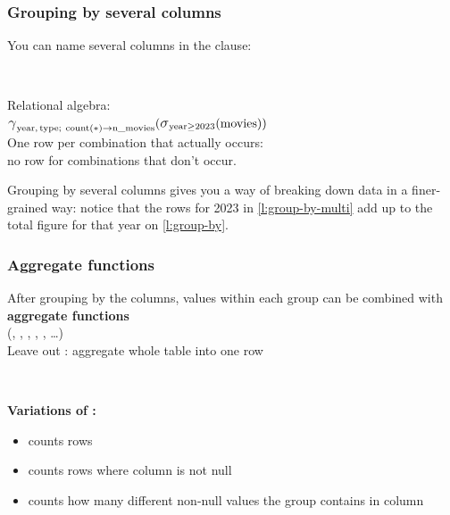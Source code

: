 \begin{frame}
    \label{s:group-by-multi}
    \frametitle{Grouping by several columns}
    You can name several columns in the  clause:
    \inputminted[fontsize=\footnotesize]{sql}{code/sql-group-by2.sql}
    \vspace{0.3em}
    {\footnotesize}\\[0.8em]
    Relational algebra:\\
    \hspace*{1em}$\raop{\gamma}_{\ra{year},\,\ra{type};\ \ra{count}(*) \to \ra{n\_movies}}(\raop{\sigma}_{\ra{year} \ge 2023}(\ra{movies}))$\\[0.8em]
    One row per  combination that actually occurs:\\
    no row for combinations that don't occur.
\end{frame}
\label{l:group-by-multi}

Grouping by several columns gives you a way of breaking down data in a finer-grained way: notice that the rows for 2023 in \autoref{l:group-by-multi} add up to the total figure for that year on \autoref{l:group-by}.

\begin{frame}
    \label{s:aggregates}
    \frametitle{Aggregate functions}
    After grouping by the  columns, values within each group can be combined with \textbf{aggregate functions}\\
    (, , , , , \dots)\\[0.5em]
    Leave out : aggregate whole table into one row
    \inputminted[fontsize=\footnotesize]{sql}{code/sql-aggregates.sql}
    \vspace{0.3em}
    {\footnotesize}\\[0.8em]\pause
    \textbf{Variations of :}
    \begin{itemize}
        \item {} counts rows
        \item {} counts rows where column  is not null
        \item {} counts how many different non-null values the group contains in column 
    \end{itemize}
\end{frame}
\label{l:aggregates}


